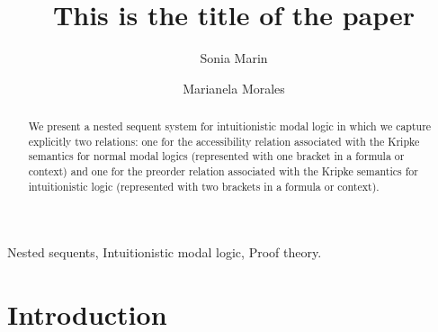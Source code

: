 \documentclass[twoside]{aiml20}
\begin{document}
\begin{frontmatter}
  \title{This is the title of the paper}
  \author{Sonia Marin}
  \address{University College London}
  \author{Marianela Morales}
  \address{LIX, \'Ecole Polytechnique  \&  Inria Saclay}
  
  \begin{abstract}
  We present a nested sequent system for intuitionistic modal logic in which we capture explicitly two relations: one for the accessibility relation associated with the Kripke semantics for normal modal logics (represented with one bracket in a formula or context) and one for the preorder relation associated with the Kripke semantics for intuitionistic logic (represented with two brackets in a formula or context).
  \end{abstract}

  \begin{keyword}
  Nested sequents, Intuitionistic modal logic, Proof theory.
  \end{keyword}
 \end{frontmatter}

%


\section{Introduction}
\end{document}
